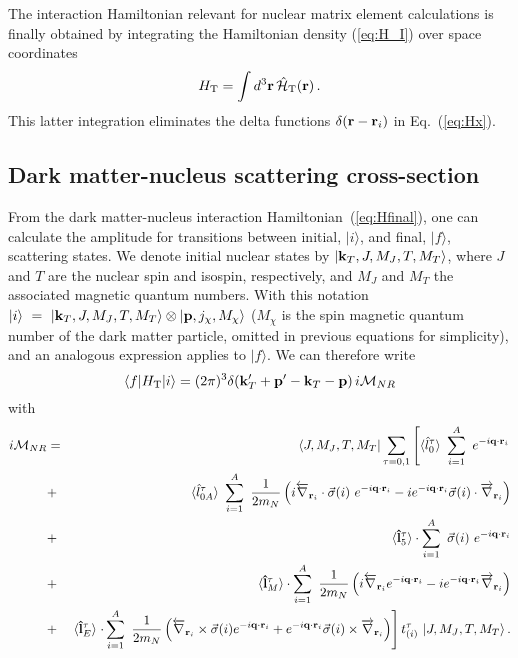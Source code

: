 \documentclass[11pt,a4paper]{article}
\begin{document}
The interaction Hamiltonian relevant for nuclear matrix element calculations is finally obtained by integrating the Hamiltonian density (\ref{eq:H_I}) over space coordinates 
\begin{eqnarray}
H_{\rm T}= \int d^{3}{\bf{r}}\, \hat{\mathcal{H}}_{\rm T}({\bf{r}}) \,.
\label{eq:Hfinal}
\end{eqnarray}
This latter integration eliminates the delta functions $\delta({\bf{r}}-{\bf{r}}_i)$ in Eq.~(\ref{eq:Hx}).

\subsection{Dark matter-nucleus scattering cross-section}
From the dark matter-nucleus interaction Hamiltonian~(\ref{eq:Hfinal}), one can calculate the amplitude for transitions between initial, $|i\rangle$, and final, $|f\rangle$, scattering states. We denote initial nuclear states by $|{\bf{k}}_T,J,M_J,T,M_T\rangle$, where $J$ and $T$ are the nuclear spin and isospin, respectively, and $M_J$ and $M_T$ the associated magnetic quantum numbers. With this notation $|i\rangle~=~|{\bf{k}}_T,J,M_J,T,M_T\rangle \otimes |{\bf{p}},j_\chi,M_\chi\rangle$ ($M_\chi$ is the spin magnetic quantum number of the dark matter particle, omitted in previous equations for simplicity), and an analogous expression applies to $|f\rangle$. We can therefore write
\begin{equation}
\langle f |H_{\rm T} |i\rangle = (2\pi)^3 \delta({\bf k}'_T+{\bf p}'-{\bf k}_T-{\bf p}) \,i \mathcal{M}_{NR}
\label{eq:M0}
\end{equation}
with 
\begin{eqnarray}
i \mathcal{M}_{NR}%
&=&
  \langle J,M_J, T, M_T | \sum_{\tau=0,1} \left[
  \langle \hat{l}_0^\tau\rangle~ \sum_{i=1}^A  ~e^{-i {\bf{q}} \cdot {\bf{r}}_i}   \right. \nonumber \\
&+& \langle \hat{l}_{0A}^{\tau}\rangle~ \sum_{i=1}^A ~ {1 \over 2m_N} \left(i \overleftarrow{\nabla}_{{\bf{r}}_i} \cdot  \vec{\sigma}(i)~ e^{-i {\bf{q}} \cdot {\bf{r}}_i}  
-ie^{-i {\bf{q}} \cdot {\bf{r}}_i}  \vec{\sigma}(i)  \cdot   \overrightarrow{\nabla}_{{\bf{r}}_i}   \right)  \nonumber \\
&+&  \langle{\bf{\hat{l}}}_5^\tau\rangle \cdot  \sum_{i=1}^A  ~\vec{\sigma}(i)~e^{-i {\bf{q}} \cdot {\bf{r}}_i} \nonumber \\
&+&  \langle{\bf{\hat{l}}}_M^\tau\rangle \cdot  \sum_{i=1}^A  ~ {1 \over 2m_N} \left(i \overleftarrow{\nabla}_{{\bf{r}}_i} e^{-i {\bf{q}} \cdot {\bf{r}}_i}  -i e^{-i {\bf{q}} \cdot {\bf{r}}_i} 
\overrightarrow{\nabla}_{{\bf{r}}_i} \right)  \nonumber \\
&+&  \langle{\bf{\hat{l}}}_E^\tau\rangle \left. \cdot  \sum_{i=1}^A ~ {1 \over 2m_N} \left( \overleftarrow{\nabla}_{{\bf{r}}_i} \times \vec{\sigma}(i) e^{-i {\bf{q}} \cdot {\bf{r}}_i}  +e^{-i {\bf{q}} \cdot {\bf{r}}_i}  \vec{\sigma}(i) \times \overrightarrow{\nabla}_{{\bf{r}}_i} \right)   \right] t^\tau_{(i)} ~ | J, M_J,T,M_T \rangle \,. \nonumber\\
\label{eq:M}
\end{eqnarray}
\end{document}
